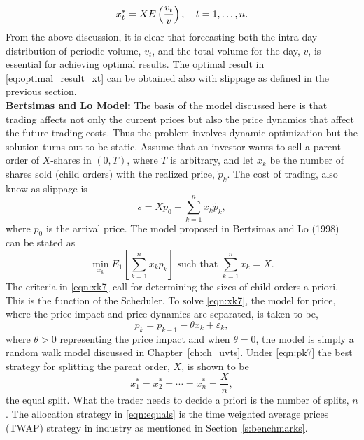 	\begin{equation} \label{eq:optimal_result_xt}
	x_t^*= X E\left(\dfrac{v_t}{v}\right), \enskip\enskip t=1,\ldots,n.
	\end{equation}
From the above discussion, it is clear that forecasting both the intra-day distribution of periodic volume, $v_t$, and the total volume for the day, $v$, is essential for achieving optimal results. The optimal result in \eqref{eq:optimal_result_xt} can be obtained also with slippage as defined in the previous section. \\


\noindent\textbf{Bertsimas and Lo Model:} The basis of the model discussed here is that trading affects not only the current prices but also the price dynamics that affect the future trading costs. Thus the problem involves dynamic optimization but the solution turns out to be static. Assume that an investor wants to sell a parent order of $X$-shares in $(0,T)$, where $T$ is arbitrary, and let $x_k$ be the number of shares sold (child orders) with the realized price, $\widetilde{p}_k$. The cost of trading, also know as slippage is
	\begin{equation} \label{eqn:x7}
	s= Xp_0 - \sum_{k=1}^n x_k\widetilde{p}_k,
	\end{equation}
where $p_0$ is the arrival price. The model proposed in Bertsimas and Lo (1998)~\cite{berlo} can be stated as
	\begin{equation} \label{eqn:xk7}
	\min_{x_k} E_1 \left[\sum_{k=1}^n x_kp_k\right] \text{ such that }\sum_{k=1}^n x_k=X.
	\end{equation}
The criteria in \eqref{eqn:xk7} call for determining the sizes of child orders a priori. This is the function of the Scheduler. To solve \eqref{eqn:xk7}, the model for price, where the price impact and price dynamics are separated, is taken to be,
	\begin{equation} \label{eqn:pk7}
	p_k = p_{k-1} - \theta x_k + \varepsilon_k,
	\end{equation}
where $\theta > 0$ representing the price impact and when $\theta = 0$, the model is simply a random walk model discussed in Chapter~\ref{ch:ch_uvts}. Under \eqref{eqn:pk7} the best strategy for splitting the parent order, $X$, is shown to be
	\begin{equation} \label{eqn:equals}
	x_1^* = x_2^* = \cdots = x_n^* = \frac{X}{n},
	\end{equation}
the equal split. What the trader needs to decide a priori is the number of splits, $n$. The allocation strategy in \eqref{eqn:equals} is the time weighted average prices (TWAP) strategy in industry as mentioned in Section~\ref{s:benchmarks}.


